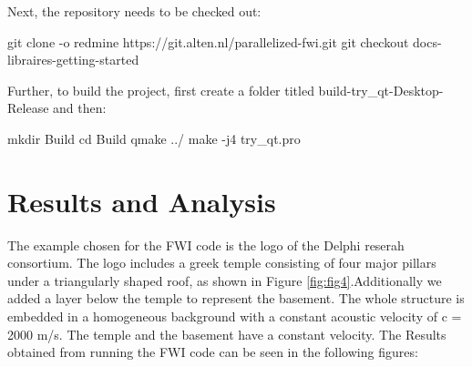 \documentclass[10pt,a4paper]{article}
\begin{document}
Next, the repository needs to be checked out:
\newline

git clone -o redmine https://git.alten.nl/parallelized-fwi.git
\newline
git checkout docs-libraires-getting-started
\newline

Further, to build the project, first create a folder titled build-try\_qt-Desktop-Release and then:
\newline

mkdir Build
\newline
cd Build
\newline
qmake ../
\newline
make -j4
\newline
try\_qt.pro

\section{Results and Analysis}

The example chosen for the FWI code is the logo of the Delphi reserah consortium. The logo includes a greek temple consisting of four major
pillars under a triangularly shaped roof, as shown in Figure \ref{fig:fig4}.Additionally we added a layer below the temple to represent the basement. The whole structure is embedded in a homogeneous background with a constant acoustic velocity of c = 2000 m/s. The temple and the basement have a constant velocity.
The Results obtained from running the FWI code can be seen in the following figures:
\end{document}
